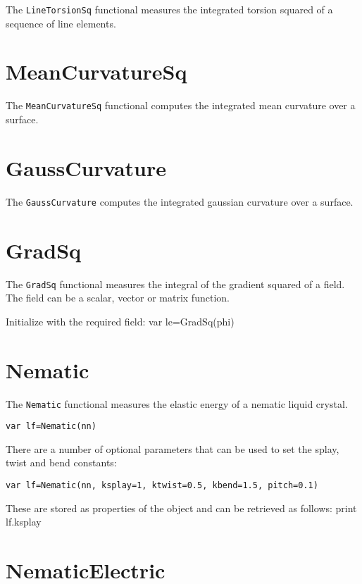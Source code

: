 The \texttt{LineTorsionSq} functional measures the integrated torsion
squared of a sequence of line elements.

\hypertarget{meancurvaturesq}{%
\section{MeanCurvatureSq}\label{meancurvaturesq}}

The \texttt{MeanCurvatureSq} functional computes the integrated mean
curvature over a surface.

\hypertarget{gausscurvature}{%
\section{GaussCurvature}\label{gausscurvature}}

The \texttt{GaussCurvature} computes the integrated gaussian curvature
over a surface.

\hypertarget{gradsq}{%
\section{GradSq}\label{gradsq}}

The \texttt{GradSq} functional measures the integral of the gradient
squared of a field. The field can be a scalar, vector or matrix
function.

Initialize with the required field: var le=GradSq(phi)

\hypertarget{nematic}{%
\section{Nematic}\label{nematic}}

The \texttt{Nematic} functional measures the elastic energy of a nematic
liquid crystal.

\begin{lstlisting}
var lf=Nematic(nn)
\end{lstlisting}

There are a number of optional parameters that can be used to set the
splay, twist and bend constants:

\begin{lstlisting}
var lf=Nematic(nn, ksplay=1, ktwist=0.5, kbend=1.5, pitch=0.1)
\end{lstlisting}

These are stored as properties of the object and can be retrieved as
follows: print lf.ksplay

\hypertarget{nematicelectric}{%
\section{NematicElectric}\label{nematicelectric}}

